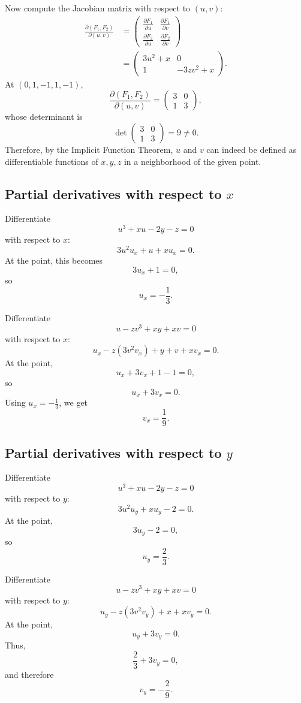 Now compute the Jacobian matrix with respect to \((u,v)\):
\[
\begin{aligned}
\frac{\partial(F_1,F_2)}{\partial(u,v)}
&=
\begin{pmatrix}
\frac{\partial F_1}{\partial u} & \frac{\partial F_1}{\partial v}\\
\frac{\partial F_2}{\partial u} & \frac{\partial F_2}{\partial v}
\end{pmatrix}\\
&=
\begin{pmatrix}
3u^2+x & 0\\
1 & -3zv^2+x
\end{pmatrix}.
\end{aligned}
\]
At \((0,1,-1,1,-1)\),
\[
\frac{\partial(F_1,F_2)}{\partial(u,v)}
=
\begin{pmatrix}
3 & 0\\
1 & 3
\end{pmatrix},
\]
whose determinant is
\[
\det
\begin{pmatrix}
3 & 0\\
1 & 3
\end{pmatrix}
=9\neq 0.
\]
Therefore, by the Implicit Function Theorem, \(u\) and \(v\) can indeed be defined as differentiable functions of \(x,y,z\) in a neighborhood of the given point.

\subsection*{Partial derivatives with respect to \(x\)}

Differentiate
\[
u^3+xu-2y-z=0
\]
with respect to \(x\):
\[
3u^2u_x+u+xu_x=0.
\]
At the point, this becomes
\[
3u_x+1=0,
\]
so
\[
u_x=-\frac13.
\]

Differentiate
\[
u-zv^3+xy+xv=0
\]
with respect to \(x\):
\[
u_x-z(3v^2v_x)+y+v+xv_x=0.
\]
At the point,
\[
u_x+3v_x+1-1=0,
\]
so
\[
u_x+3v_x=0.
\]
Using \(u_x=-\frac13\), we get
\[
v_x=\frac19.
\]

\subsection*{Partial derivatives with respect to \(y\)}

Differentiate
\[
u^3+xu-2y-z=0
\]
with respect to \(y\):
\[
3u^2u_y+xu_y-2=0.
\]
At the point,
\[
3u_y-2=0,
\]
so
\[
u_y=\frac23.
\]

Differentiate
\[
u-zv^3+xy+xv=0
\]
with respect to \(y\):
\[
u_y-z(3v^2v_y)+x+xv_y=0.
\]
At the point,
\[
u_y+3v_y=0.
\]
Thus,
\[
\frac23+3v_y=0,
\]
and therefore
\[
v_y=-\frac29.
\]

